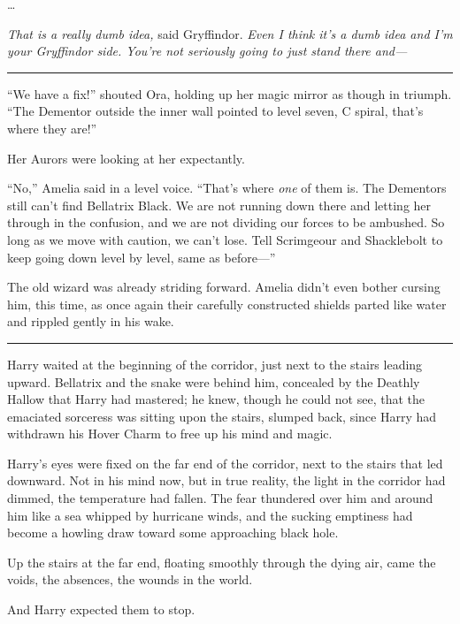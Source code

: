 \ldots{}

\emph{That is a really dumb idea,} said Gryffindor. \emph{Even I think
it's a dumb idea and I'm your Gryffindor side. You're not seriously
going to just stand there and---}

\begin{center}\rule{3in}{0.4pt}\end{center}

``We have a fix!'' shouted Ora, holding up her magic mirror as though in
triumph. ``The Dementor outside the inner wall pointed to level seven, C
spiral, that's where they are!''

Her Aurors were looking at her expectantly.

``No,'' Amelia said in a level voice. ``That's where \emph{one} of them
is. The Dementors still can't find Bellatrix Black. We are not running
down there and letting her through in the confusion, and we are not
dividing our forces to be ambushed. So long as we move with caution, we
can't lose. Tell Scrimgeour and Shacklebolt to keep going down level by
level, same as before---''

The old wizard was already striding forward. Amelia didn't even bother
cursing him, this time, as once again their carefully constructed
shields parted like water and rippled gently in his wake.

\begin{center}\rule{3in}{0.4pt}\end{center}

Harry waited at the beginning of the corridor, just next to the stairs
leading upward. Bellatrix and the snake were behind him, concealed by
the Deathly Hallow that Harry had mastered; he knew, though he could not
see, that the emaciated sorceress was sitting upon the stairs, slumped
back, since Harry had withdrawn his Hover Charm to free up his mind and
magic.

Harry's eyes were fixed on the far end of the corridor, next to the
stairs that led downward. Not in his mind now, but in true reality, the
light in the corridor had dimmed, the temperature had fallen. The fear
thundered over him and around him like a sea whipped by hurricane winds,
and the sucking emptiness had become a howling draw toward some
approaching black hole.

Up the stairs at the far end, floating smoothly through the dying air,
came the voids, the absences, the wounds in the world.

And Harry expected them to stop.

